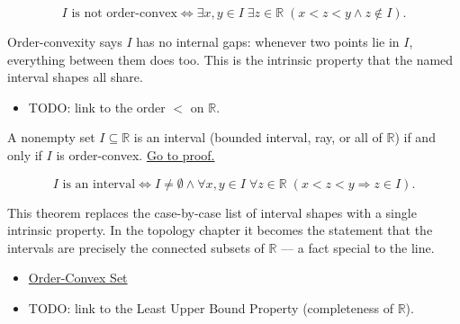 \begin{remark*}
\[
I \text{ is not order-convex} \Longleftrightarrow \exists x,y\in I\;\exists z\in\mathbb{R}\;(x<z<y\land z\notin I).
\]
\end{remark*}
\begin{remark*}[Interpretation]
Order-convexity says $I$ has no internal gaps: whenever two points lie in $I$, everything between them does too. This is the intrinsic property that the named interval shapes all share.
\end{remark*}
\begin{dependencies}
\begin{itemize}
  \item TODO: link to the order $<$ on $\mathbb{R}$.
\end{itemize}
\end{dependencies}
\begin{tcolorbox}[colback=thmbox, colframe=thmborder, arc=2pt,
  left=6pt, right=6pt, top=4pt, bottom=4pt,
  title={\small\textbf{Theorem (Intervals Are Exactly the Order-Convex Sets)}},
  fonttitle=\small\bfseries]
\begin{theorem}
\label{thm:interval-iff-order-convex}
A nonempty set $I\subseteq\mathbb{R}$ is an interval (bounded interval, ray, or all of $\mathbb{R}$) if and only if $I$ is order-convex.
\hyperref[prf:interval-iff-order-convex]{Go to proof.}
\end{theorem}
\end{tcolorbox}
\begin{remark*}
\[
I \text{ is an interval} \Longleftrightarrow I\neq\emptyset \land \forall x,y\in I\;\forall z\in\mathbb{R}\;(x<z<y\Rightarrow z\in I).
\]
\end{remark*}
\begin{remark*}[Interpretation]
This theorem replaces the case-by-case list of interval shapes with a single intrinsic property. In the topology chapter it becomes the statement that the intervals are precisely the connected subsets of $\mathbb{R}$ --- a fact special to the line.
\end{remark*}
\begin{dependencies}
\begin{itemize}
  \item \hyperref[def:order-convex-set]{Order-Convex Set}
  \item TODO: link to the Least Upper Bound Property (completeness of $\mathbb{R}$).
\end{itemize}
\end{dependencies}

